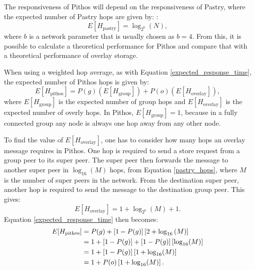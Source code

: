 \documentclass[10pt,a4paper,conference]{IEEEtran}
\begin{document}
The responsiveness of Pithos will depend on the responsiveness of Pastry, where the expected number of Pastry hops are given by:
\cite{storage_and_chaching_PAST}:
%
\begin{equation}\label{pastry_hops}
    E[H_{\textrm{pastry}}] = \log_{2^b}\left(N\right),
\end{equation}
%
where $b$ is a network parameter that is usually chosen as $b = 4$. From this, it is possible to calculate a theoretical performance for Pithos and
compare that with a theoretical performance of overlay storage.

When using a weighted hop average, as with Equation \eqref{expected_response_time}, the expected number of Pithos hops is given by:
%
\begin{equation}\label{expected_response_time}
    E[H_{\textrm{pithos}}] = P(g)\left(E\left[H_{\textrm{group}}\right]\right) + P(o)\left(E\left[H_{\textrm{overlay}}\right]\right),
\end{equation}
%
where $E\left[H_{\textrm{group}}\right]$ is the expected number of group hops and $E\left[H_{\textrm{overlay}}\right]$ is the expected number of
overly hops. In Pithos, $E\left[H_{\textrm{group}}\right] = 1$, because in a fully connected group any node is always one hop away from any other
node.

To find the value of $E\left[H_{\textrm{overlay}}\right]$, one has to consider how many hops an overlay message requires in Pithos. One hop is
required to send a store request from a group peer to its super peer. The super peer then forwards the message to another super peer in
$\log_{16}(M)$ hops, from Equation \eqref{pastry_hops}, where $M$ is the number of super peers in the network. From the destination super peer,
another hop is required to send the message to the destination group peer. This gives:
%
\begin{equation}\label{group_hops}
    E\left[H_{\textrm{overlay}}\right] = 1 + \log_{2^b}(M) + 1.
\end{equation}
%
Equation \eqref{expected_response_time} then becomes:
%
\begin{align}
E[H_{\textrm{pithos}}] &= P(g) + \left[1 - P(g)\right]\left[2 + \log_{16}\left(M\right)\right]\notag\\
                       &= 1 + \left[1 - P(g)\right] + \left[1 - P(g)\right]\left[\log_{16}(M)\right]\notag\\
                       &= 1 + \left[1 - P(g)\right]\left[1 + \log_{16}(M)\right]\notag\\
                       &= 1 + P(o)\left[1 + \log_{16}(M)\right].\label{expected_response_time_exp}
\end{align}
\end{document}
